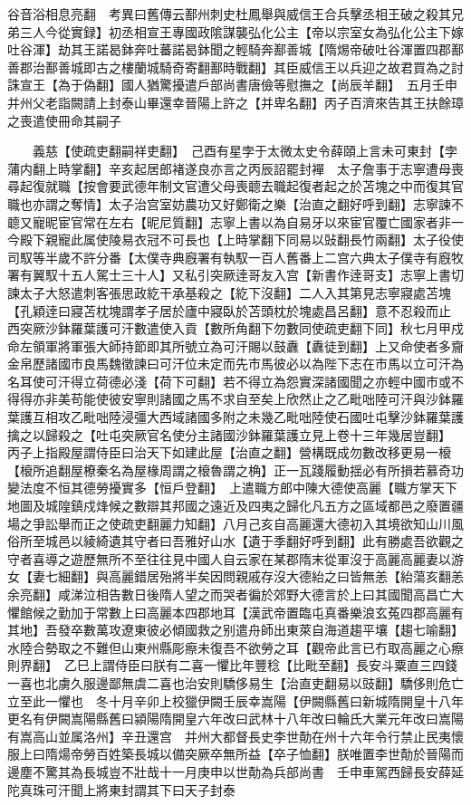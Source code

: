 谷音浴相息亮翻　考異曰舊傳云鄯州刺史杜鳳舉與威信王合兵擊丞相王破之殺其兄弟三人今從實録】初丞相宣王專國政隂謀襲弘化公主【帝以宗室女為弘化公主下嫁吐谷渾】劫其王諾曷鉢奔吐蕃諾曷鉢聞之輕騎奔鄯善城【隋焬帝破吐谷渾置四郡鄯善郡治鄯善城即古之樓蘭城騎奇寄翻鄯時戰翻】其臣威信王以兵迎之故君買為之討誅宣王【為于偽翻】國人猶驚擾遣戶部尚書唐儉等慰撫之【尚辰羊翻】　五月壬申并州父老詣闕請上封泰山畢還幸晉陽上許之【并卑名翻】丙子百濟來告其王扶餘璋之喪遣使冊命其嗣子

　　義慈【使疏吏翻嗣祥吏翻】　己酉有星孛于太微太史令薛頤上言未可東封【孛蒲内翻上時掌翻】辛亥起居郎褚遂良亦言之丙辰詔罷封襌　太子詹事于志寧遭母喪尋起復就職【按會要武德年制文官遭父母喪聼去職起復者起之於苫塊之中而復其官職也亦謂之奪情】太子治宫室妨農功又好鄭衛之樂【治直之翻好呼到翻】志寧諫不聼又寵昵宦官常在左右【昵尼質翻】志寧上書以為自易牙以來宦官覆亡國家者非一今殿下親寵此属使陵易衣冠不可長也【上時掌翻下同易以䜴翻長竹兩翻】太子役使司馭等半歲不許分番【太僕寺典廐署有執馭一百人舊番上二宫六典太子僕寺有廐牧署有翼馭十五人駕士三十人】又私引突厥逹哥友入宫【新書作逹哥支】志寧上書切諫太子大怒遣刺客張思政紇干承基殺之【紇下沒翻】二人入其第見志寧寢處苫塊【孔穎逹曰寢苫枕塊謂孝子居於廬中寢臥於苫頭枕於塊處昌呂翻】意不忍殺而止　西突厥沙鉢羅葉護可汗數遣使入貢【數所角翻下勿數同使疏吏翻下同】秋七月甲戍命左領軍將軍張大師持節即其所號立為可汗賜以鼓纛【纛徒到翻】上又命使者多齎金帛歷諸國市良馬魏徵諫曰可汗位未定而先市馬彼必以為陛下志在市馬以立可汗為名耳使可汗得立荷德必淺【荷下可翻】若不得立為怨實深諸國聞之亦輕中國市或不得得亦非美苟能使彼安寧則諸國之馬不求自至矣上欣然止之乙毗咄陸可汗與沙鉢羅葉護互相攻乙毗咄陸浸彊大西域諸國多附之未幾乙毗咄陸使石國吐屯擊沙鉢羅葉護擒之以歸殺之【吐屯突厥官名使分主諸國沙鉢羅葉護立見上卷十三年幾居豈翻】　丙子上指殿屋謂侍臣曰治天下如建此屋【治直之翻】營構既成勿數改移更易一榱【榱所追翻屋橑秦名為屋椽周謂之榱魯謂之桷】正一瓦踐履動揺必有所損若慕奇功變法度不恒其德勞擾實多【恒戶登翻】　上遣職方郎中陳大德使高麗【職方掌天下地圖及城隍鎮戍烽候之數辯其邦國之遠近及四夷之歸化凡五方之區域都邑之廢置疆場之爭訟舉而正之使疏吏翻麗力知翻】八月己亥自高麗還大德初入其境欲知山川風俗所至城邑以綾綺遺其守者曰吾雅好山水【遺于季翻好呼到翻】此有勝處吾欲觀之守者喜導之遊歷無所不至往往見中國人自云家在某郡隋末從軍沒于高麗高麗妻以游女【妻七細翻】與高麗錯居殆將半矣因問親戚存沒大德紿之曰皆無恙【紿蕩亥翻恙余亮翻】咸涕泣相告數日後隋人望之而哭者徧於郊野大德言於上曰其國聞高昌亡大懼館候之勤加于常數上曰高麗本四郡地耳【漢武帝置臨屯真番樂浪玄菟四郡高麗有其地】吾發卒數萬攻遼東彼必傾國救之别遣舟師出東萊自海道趨平壤【趨七喻翻】水陸合勢取之不難但山東州縣彫瘵未復吾不欲勞之耳【觀帝此言已冇取高麗之心瘵則界翻】　乙巳上謂侍臣曰朕有二喜一懼比年豐稔【比毗至翻】長安斗粟直三四錢一喜也北虜久服邊鄙無虞二喜也治安則驕侈易生【治直吏翻易以豉翻】驕侈則危亡立至此一懼也　冬十月辛卯上校獵伊闕壬辰幸嵩陽【伊闕縣舊曰新城隋開皇十八年更名有伊闕嵩陽縣舊曰潁陽隋開皇六年改曰武林十八年改曰輪氏大業元年改曰嵩陽有嵩高山並属洛州】辛丑還宫　并州大都督長史李世勣在州十六年令行禁止民夷懷服上曰隋煬帝勞百姓築長城以備突厥卒無所益【卒子恤翻】朕唯置李世勣於晉陽而邊塵不驚其為長城豈不壯哉十一月庚申以世勣為兵部尚書　壬申車駕西歸長安薛延陀真珠可汗聞上將東封謂其下曰天子封泰

